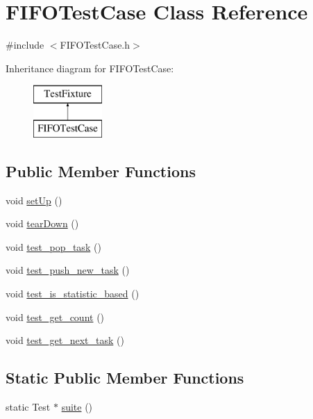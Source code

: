 \hypertarget{class_f_i_f_o_test_case}{}\section{F\+I\+F\+O\+Test\+Case Class Reference}
\label{class_f_i_f_o_test_case}


{\ttfamily \#include $<$F\+I\+F\+O\+Test\+Case.\+h$>$}

Inheritance diagram for F\+I\+F\+O\+Test\+Case\+:\begin{figure}[H]
\begin{center}
\leavevmode
\includegraphics[height=2.000000cm]{class_f_i_f_o_test_case}
\end{center}
\end{figure}
\subsection*{Public Member Functions}
\begin{DoxyCompactItemize}
\item 
void \hyperlink{class_f_i_f_o_test_case_a495f68d6fc339a408d0fba28cc50ebc6}{set\+Up} ()
\item 
void \hyperlink{class_f_i_f_o_test_case_a584d644de7aa5dcb2027b3f4ea8da683}{tear\+Down} ()
\item 
void \hyperlink{class_f_i_f_o_test_case_adef49d5e56109bf1ed0f23210c57d761}{test\+\_\+pop\+\_\+task} ()
\item 
void \hyperlink{class_f_i_f_o_test_case_a749871e27042f119be009b27bc082136}{test\+\_\+push\+\_\+new\+\_\+task} ()
\item 
void \hyperlink{class_f_i_f_o_test_case_a53bda2037e4df5fd0be76a8485766b27}{test\+\_\+is\+\_\+statistic\+\_\+based} ()
\item 
void \hyperlink{class_f_i_f_o_test_case_a0e5bf8bbab4e77bce4092bc0b3c5192b}{test\+\_\+get\+\_\+count} ()
\item 
void \hyperlink{class_f_i_f_o_test_case_a8f870e880a9d9092042ac5f7d55a120a}{test\+\_\+get\+\_\+next\+\_\+task} ()
\end{DoxyCompactItemize}
\subsection*{Static Public Member Functions}
\begin{DoxyCompactItemize}
\item 
static Test $\ast$ \hyperlink{class_f_i_f_o_test_case_ad80f96dab4623dcaf147db1582af9574}{suite} ()
\end{DoxyCompactItemize}


